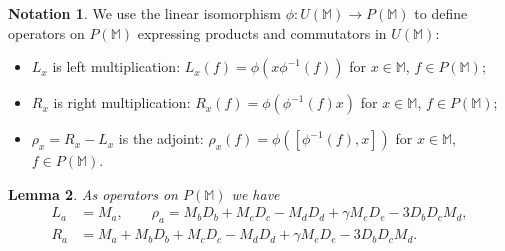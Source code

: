 \documentclass{amsart}
\theoremstyle{plain}
\newtheorem{lemma}{Lemma}[section]
\theoremstyle{definition}
\newtheorem{notation}[lemma]{Notation}
\begin{document}
\begin{notation}
We use the linear isomorphism $\phi\colon U(\mathbb{M}) \to P(\mathbb{M})$ to
define operators on $P(\mathbb{M})$ expressing products and commutators in
$U(\mathbb{M})$:
  \begin{itemize}
  \item $L_x$ is left multiplication: $L_x(f) = \phi( x \phi^{-1}(f) )$ for
      $x \in \mathbb{M}$, $f \in P(\mathbb{M})$;
  \item $R_x$ is right multiplication: $R_x(f) = \phi( \phi^{-1}(f) x )$
      for $x \in \mathbb{M}$, $f \in P(\mathbb{M})$;
  \item $\rho_x = R_x - L_x$ is the adjoint: $\rho_x(f) = \phi( [
      \phi^{-1}(f), x ] )$ for $x \in \mathbb{M}$, $f \in P(\mathbb{M})$.
  \end{itemize}
\end{notation}

\begin{lemma} \label{a-formulas}
As operators on $P(\mathbb{M})$ we have
  \allowdisplaybreaks
  \begin{align*}
  L_a
  &=
  M_a,
  \qquad
  \rho_a
  =
  M_b D_b + M_c D_c - M_d D_d + \gamma M_e D_e - 3 D_b D_c M_d,
  \\
  R_a
  &=
  M_a + M_b D_b + M_c D_c - M_d D_d + \gamma M_e D_e -  3D_b D_c M_d.
  \end{align*}
\end{lemma}
\end{document}
